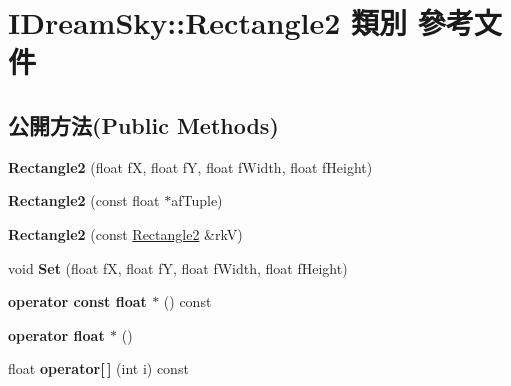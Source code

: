 \hypertarget{class_i_dream_sky_1_1_rectangle2}{}\section{I\+Dream\+Sky\+:\+:Rectangle2 類別 參考文件}
\label{class_i_dream_sky_1_1_rectangle2}
\subsection*{公開方法(Public Methods)}
\begin{DoxyCompactItemize}
\item 
{\bfseries Rectangle2} (float fX, float fY, float f\+Width, float f\+Height)\hypertarget{class_i_dream_sky_1_1_rectangle2_a4564836390230478153dc94e8be9a3ab}{}\label{class_i_dream_sky_1_1_rectangle2_a4564836390230478153dc94e8be9a3ab}

\item 
{\bfseries Rectangle2} (const float $\ast$af\+Tuple)\hypertarget{class_i_dream_sky_1_1_rectangle2_a3f3d726bf41ba44d8831b33724f79499}{}\label{class_i_dream_sky_1_1_rectangle2_a3f3d726bf41ba44d8831b33724f79499}

\item 
{\bfseries Rectangle2} (const \hyperlink{class_i_dream_sky_1_1_rectangle2}{Rectangle2} \&rkV)\hypertarget{class_i_dream_sky_1_1_rectangle2_abb0e2d52da781a38117a179f144c57bc}{}\label{class_i_dream_sky_1_1_rectangle2_abb0e2d52da781a38117a179f144c57bc}

\item 
void {\bfseries Set} (float fX, float fY, float f\+Width, float f\+Height)\hypertarget{class_i_dream_sky_1_1_rectangle2_a30e61af101d572127834c67f116603fd}{}\label{class_i_dream_sky_1_1_rectangle2_a30e61af101d572127834c67f116603fd}

\item 
{\bfseries operator const float $\ast$} () const \hypertarget{class_i_dream_sky_1_1_rectangle2_a290f5ccc84b5e4c34ed1fd1294b2473e}{}\label{class_i_dream_sky_1_1_rectangle2_a290f5ccc84b5e4c34ed1fd1294b2473e}

\item 
{\bfseries operator float $\ast$} ()\hypertarget{class_i_dream_sky_1_1_rectangle2_a9df90aa3e93ef16b689e25f25a246e73}{}\label{class_i_dream_sky_1_1_rectangle2_a9df90aa3e93ef16b689e25f25a246e73}

\item 
float {\bfseries operator\mbox{[}$\,$\mbox{]}} (int i) const \hypertarget{class_i_dream_sky_1_1_rectangle2_acacfd0531609944cdb4405094df575c2}{}\label{class_i_dream_sky_1_1_rectangle2_acacfd0531609944cdb4405094df575c2}


\end{DoxyCompactItemize}

